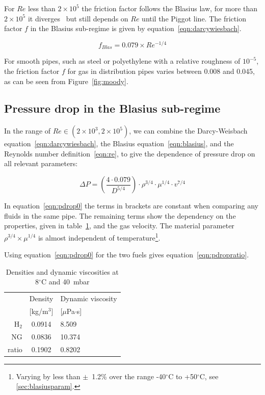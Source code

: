 \documentclass[5p]{elsarticle} %
\begin{document}
For $Re$ less than $2\times10^5$ the friction factor follows the Blasius law, for more than $2\times10^5$ it diverges~\cite{Allen2007} but still depends on $Re$ until the Piggot line.
The friction factor $f$ in the Blasius sub-regime is given by equation~\eqref{eqn:darcywiesbach}\citep{Bennet2017}.

\begin{equation}
\label{eqn:blasius}
f_{Blas} = 0.079 \times Re^{-1/4}
\end{equation}

For smooth pipes, such as steel or polyethylene with a relative roughness of $10^{-5}$, the friction factor $f$ for gas in distribution pipes varies between 0.008 and 0.045, as can be seen from Figure~\ref{fig:moody}.

\subsection{Pressure drop in the Blasius sub-regime}
\label{sec:pressuredrop}

In the range of $Re \in (2\times10^3,2\times10^5)$, we can combine the Darcy-Weisbach equation~\eqref{eqn:darcywiesbach}, the Blasius equation~\eqref{eqn:blasius}, and the Reynolds number definition~\eqref{eqn:re}, to give the dependence of pressure drop on all relevant parameters:

\begin{equation}
\label{eqn:pdrop0}
\Delta P = \left ( \frac{4 \cdot 0.079}{D^{5/4}}\right ) \cdot \rho^{3/4} \cdot \mu^{1/4} \cdot v^{7/4}
\end{equation}

In equation~\eqref{eqn:pdrop0} the terms in brackets are constant when comparing any fluids in the same pipe. 
The remaining terms show the dependency on the properties, given in table~\ref{tab:dyn}, and the gas velocity.
The  material parameter $\rho^{3/4} \times \mu^{1/4}$ is almost independent of 
temperature\footnote{
Varying by less than $\pm$~1.2\% over the range -40$^\circ$C to +50$^\circ$C, see \ref{sec:blasiusparam}.
}.

Using equation~\eqref{eqn:pdrop0} for the two fuels gives equation~\eqref{eqn:pdropratio}.

\begin{table}
\centering
\begin{tabular}{r|c|l}
& Density & Dynamic viscosity \\
& [kg/m$^3$] & [$\mu$Pa$\cdot$s] \\
\hline
H$_2$ & 0.0914 & 8.509 \\
NG & 0.0836 & 10.374 \\
\hline
ratio & 0.1902 & 0.8202
\end{tabular}
\caption{\label{tab:dyn}Densities and dynamic viscosities at 8$^\circ$C and 40~mbar }
\end{table}
\end{document}
